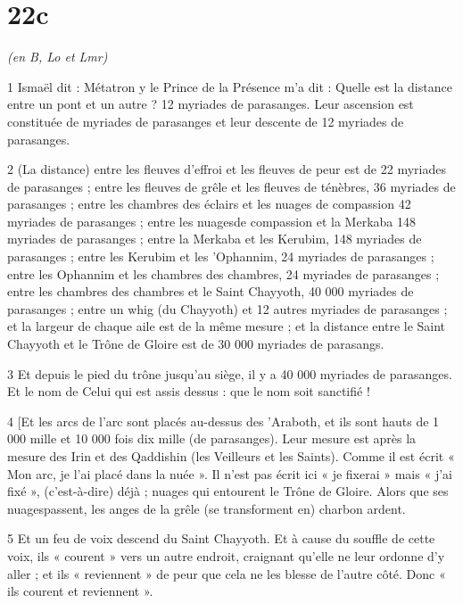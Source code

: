 \chapter{22c}

\par \textit{(en B, Lo et Lmr)}

\par 1 Ismaël dit : Métatron y le Prince de la Présence m'a dit : Quelle est la distance entre un pont et un autre ? 12 myriades de parasanges. Leur ascension est constituée de myriades de parasanges et leur descente de 12 myriades de parasanges.

\par 2 (La distance) entre les fleuves d'effroi et les fleuves de peur est de 22 myriades de parasanges ; entre les fleuves de grêle et les fleuves de ténèbres, 36 myriades de parasanges ; entre les chambres des éclairs et les nuages ​​de compassion 42 myriades de parasanges ; entre les nuages ​​de compassion et la Merkaba 148 myriades de parasanges ; entre la Merkaba et les Kerubim, 148 myriades de parasanges ; entre les Kerubim et les 'Ophannim, 24 myriades de parasanges ; entre les Ophannim et les chambres des chambres, 24 myriades de parasanges ; entre les chambres des chambres et le Saint Chayyoth, 40 000 myriades de parasanges ; entre un whig (du Chayyoth) et 12 autres myriades de parasanges ; et la largeur de chaque aile est de la même mesure ; et la distance entre le Saint Chayyoth et le Trône de Gloire est de 30 000 myriades de parasangs.

\par 3 Et depuis le pied du trône jusqu'au siège, il y a 40 000 myriades de parasanges. Et le nom de Celui qui est assis dessus : que le nom soit sanctifié !

\par 4 [Et les arcs de l'arc sont placés au-dessus des 'Araboth, et ils sont hauts de 1 000 mille et 10 000 fois dix mille (de parasanges). Leur mesure est après la mesure des Irin et des Qaddishin (les Veilleurs et les Saints). Comme il est écrit « Mon arc, je l'ai placé dans la nuée ». Il n'est pas écrit ici « je fixerai » mais « j'ai fixé », (c'est-à-dire) déjà ; nuages ​​qui entourent le Trône de Gloire. Alors que ses nuages ​​passent, les anges de la grêle (se transforment en) charbon ardent.

\par 5 Et un feu de voix descend du Saint Chayyoth. Et à cause du souffle de cette voix, ils « courent » vers un autre endroit, craignant qu'elle ne leur ordonne d'y aller ; et ils « reviennent » de peur que cela ne les blesse de l’autre côté. Donc « ils courent et reviennent ».

